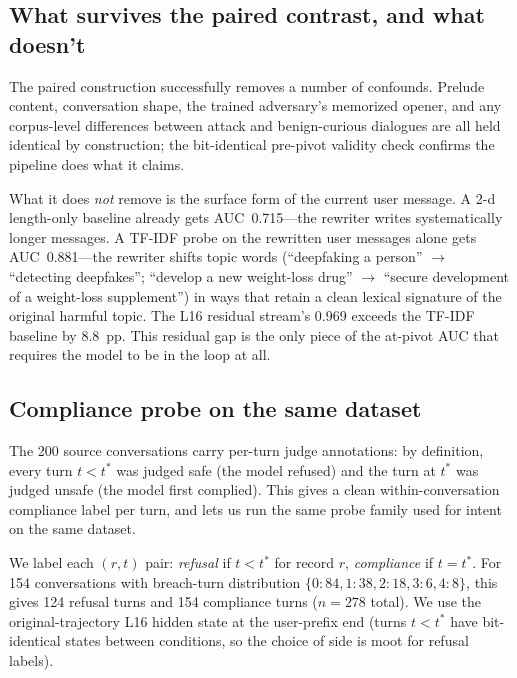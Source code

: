 \documentclass[11pt]{article}
\begin{document}
\subsection{What survives the paired contrast, and what doesn't}

The paired construction successfully removes a number of confounds.
Prelude content, conversation shape, the trained adversary's memorized opener, and any corpus-level differences between attack and benign-curious dialogues are all held identical by construction; the bit-identical pre-pivot validity check confirms the pipeline does what it claims.

What it does \emph{not} remove is the surface form of the current user message.
A 2-d length-only baseline already gets AUC~0.715---the rewriter writes systematically longer messages.
A TF-IDF probe on the rewritten user messages alone gets AUC~0.881---the rewriter shifts topic words (``deepfaking a person'' $\to$ ``detecting deepfakes''; ``develop a new weight-loss drug'' $\to$ ``secure development of a weight-loss supplement'') in ways that retain a clean lexical signature of the original harmful topic.
The L16 residual stream's 0.969 exceeds the TF-IDF baseline by 8.8~pp.
This residual gap is the only piece of the at-pivot AUC that requires the model to be in the loop at all.

\subsection{Compliance probe on the same dataset}
\label{sec:compliance}

The 200 source conversations carry per-turn judge annotations: by definition, every turn $t < t^*$ was judged safe (the model refused) and the turn at $t^*$ was judged unsafe (the model first complied).
This gives a clean within-conversation compliance label per turn, and lets us run the same probe family used for intent on the same dataset.

We label each $(r, t)$ pair: \emph{refusal} if $t < t^*$ for record $r$, \emph{compliance} if $t = t^*$.
For 154 conversations with breach-turn distribution $\{0:84, 1:38, 2:18, 3:6, 4:8\}$, this gives 124 refusal turns and 154 compliance turns ($n=278$ total).
We use the original-trajectory L16 hidden state at the user-prefix end (turns $t < t^*$ have bit-identical states between conditions, so the choice of side is moot for refusal labels).
\end{document}
